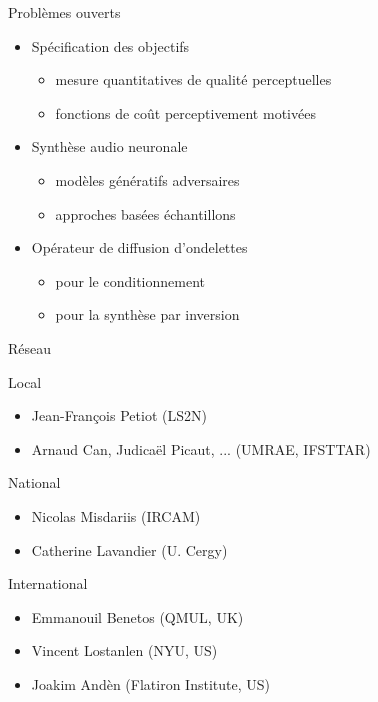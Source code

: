 \begin{frame}{Problèmes ouverts}
\begin{itemize}
  \item Spécification des objectifs
  \begin{itemize}
  \item mesure quantitatives de qualité perceptuelles
  \item fonctions de coût perceptivement motivées
  \end{itemize}
\item Synthèse audio neuronale
\begin{itemize}
  \item modèles génératifs adversaires
\item approches basées échantillons
\end{itemize}
\item Opérateur de diffusion d'ondelettes
\begin{itemize}
\item pour le conditionnement
\item pour la synthèse par inversion
\end{itemize}
\end{itemize}
\end{frame}

%


\begin{frame}{Réseau}
\begin{block}{Local}
\begin{itemize}
\item Jean-François Petiot (LS2N)
\item Arnaud Can, Judicaël Picaut, ... (UMRAE, IFSTTAR)
\end{itemize}
\end{block}
\begin{block}{National}
\begin{itemize}
\item Nicolas Misdariis (IRCAM)
\item Catherine Lavandier (U. Cergy)
\end{itemize}
\end{block}
\begin{block}{International}
\begin{itemize}
\item Emmanouil Benetos (QMUL, UK)
\item Vincent Lostanlen (NYU, US)
\item Joakim Andèn (Flatiron Institute, US)
\end{itemize}
\end{block}
\end{frame}

